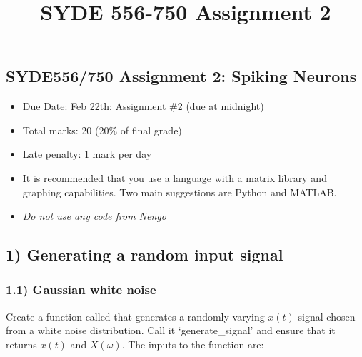 \documentclass{article}
\title{SYDE 556-750 Assignment 2}
\begin{document}
    
    
    \maketitle
    
    

    
    \subsection{SYDE556/750 Assignment 2: Spiking
Neurons}\label{syde556750-assignment-2-spiking-neurons}

\begin{itemize}
\itemsep1pt\parskip0pt
\item
  Due Date: Feb 22th: Assignment \#2 (due at midnight)
\item
  Total marks: 20 (20\% of final grade)
\item
  Late penalty: 1 mark per day
\item
  It is recommended that you use a language with a matrix library and
  graphing capabilities. Two main suggestions are Python and MATLAB.
\item
  \emph{Do not use any code from Nengo}
\end{itemize}

    \subsection{1) Generating a random input
signal}\label{generating-a-random-input-signal}

\subsubsection{1.1) Gaussian white noise}\label{gaussian-white-noise}

Create a function called that generates a randomly varying $x(t)$ signal
chosen from a white noise distribution. Call it `generate\_signal' and
ensure that it returns $x(t)$ and $X(\omega)$. The inputs to the
function are:
\end{document}
